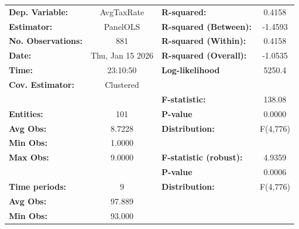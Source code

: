 \begin{center}
\begin{tabular}{lclc}
\toprule
\textbf{Dep. Variable:}                           &     AvgTaxRate     & \textbf{  R-squared:         }   &      0.4158      \\
\textbf{Estimator:}                               &      PanelOLS      & \textbf{  R-squared (Between):}  &     -1.4593      \\
\textbf{No. Observations:}                        &        881         & \textbf{  R-squared (Within):}   &      0.4158      \\
\textbf{Date:}                                    &  Thu, Jan 15 2026  & \textbf{  R-squared (Overall):}  &     -1.0535      \\
\textbf{Time:}                                    &      23:10:50      & \textbf{  Log-likelihood     }   &      5250.4      \\
\textbf{Cov. Estimator:}                          &     Clustered      & \textbf{                     }   &                  \\
\textbf{}                                         &                    & \textbf{  F-statistic:       }   &      138.08      \\
\textbf{Entities:}                                &        101         & \textbf{  P-value            }   &      0.0000      \\
\textbf{Avg Obs:}                                 &       8.7228       & \textbf{  Distribution:      }   &     F(4,776)     \\
\textbf{Min Obs:}                                 &       1.0000       & \textbf{                     }   &                  \\
\textbf{Max Obs:}                                 &       9.0000       & \textbf{  F-statistic (robust):} &      4.9359      \\
\textbf{}                                         &                    & \textbf{  P-value            }   &      0.0006      \\
\textbf{Time periods:}                            &         9          & \textbf{  Distribution:      }   &     F(4,776)     \\
\textbf{Avg Obs:}                                 &       97.889       & \textbf{                     }   &                  \\
\textbf{Min Obs:}                                 &       93.000       & \textbf{                     }   &                  \\

\end{tabular}
\end{center}
